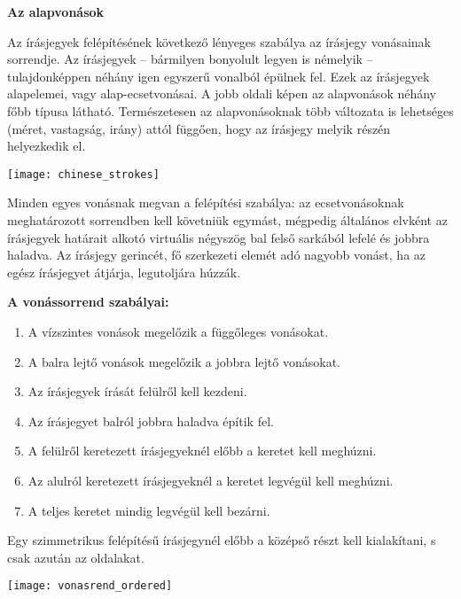 
{\large \textbf{Az alapvonások}}

Az írásjegyek felépítésének következő lényeges szabálya az írásjegy vonásainak sorrendje. Az írásjegyek – bármilyen bonyolult legyen is némelyik – tulajdonképpen néhány igen egyszerű vonalból épülnek fel. Ezek az írásjegyek alapelemei, vagy alap-ecsetvonásai. A jobb oldali képen az alapvonások néhány főbb típusa látható. Természetesen az alapvonásoknak több változata is lehetséges (méret, vastagság, irány) attól függően, hogy az írásjegy melyik részén helyezkedik el.

\begin{center}
	\texttt{[image: chinese\_strokes]}
\end{center}



Minden egyes vonásnak megvan a felépítési szabálya: az ecsetvonásoknak meghatározott sorrendben kell követniük egymást, mégpedig általános elvként az írásjegyek határait alkotó virtuális négyszög bal felső sarkából lefelé és jobbra haladva. Az írásjegy gerincét, fő szerkezeti elemét adó nagyobb vonást, ha az egész írásjegyet átjárja, legutoljára húzzák.

\newpage
{\large \textbf{A vonássorrend szabályai: }}
\begin{enumerate}
	\item A vízszintes vonások megelőzik a függőleges vonásokat.
	\item A balra lejtő vonások megelőzik a jobbra lejtő vonásokat. 
	\item Az írásjegyek írását felülről kell kezdeni. 
	\item Az írásjegyet balról jobbra haladva építik fel. 
	\item A felülről keretezett írásjegyeknél előbb a keretet kell meghúzni. 
	\item Az alulról keretezett írásjegyeknél a keretet legvégül kell meghúzni. 
	\item A teljes keretet mindig legvégül kell bezárni.
\end{enumerate}

Egy szimmetrikus felépítésű írásjegynél előbb a középső részt kell kialakítani, s csak azután az oldalakat.

\begin{center}
	\texttt{[image: vonasrend\_ordered]}
\end{center}


